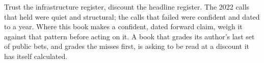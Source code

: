 \begin{cautionbox}[title={How to read this book's forward claims}]
Trust the infrastructure register, discount the headline register. The 2022 calls that held were quiet and structural; the calls that failed were confident and dated to a year. Where this book makes a confident, dated forward claim, weigh it against that pattern before acting on it. A book that grades its author's last set of public bets, and grades the misses first, is asking to be read at a discount it has itself calculated.
\end{cautionbox}
